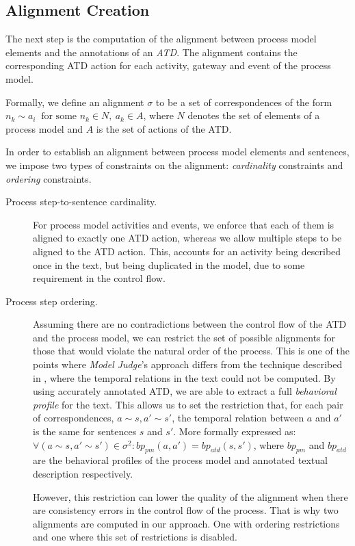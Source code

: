 \subsection{Alignment Creation}
\label{sec:alignment_creation}

The next step is the computation of the alignment between process model elements
and the annotations of an \emph{ATD}. The alignment contains the
corresponding ATD action for each activity, gateway and event of the process model.

\newcommand{\corresp}[2]{#1 \sim #2}
\newcommand{\ncorresp}[2]{#1 \nsim #2}

Formally, we define an alignment $\sigma$ to be a set of correspondences of the
form $\corresp{n_k}{a_i} ~ \text{ for some } n_k \in N, ~ a_k \in A$, where $N$
denotes the set of elements of a process model and  $A$ is the set of actions
of the ATD. 

In order to establish an alignment between process model elements and sentences,
we impose two types of constraints on the alignment:  \textit{cardinality}
constraints and \textit{ordering} constraints.

\begin{description}
\item[Process step-to-sentence cardinality.]{
    For process model activities and events, we enforce that each of them is
    aligned to exactly one ATD action, whereas we allow multiple steps to be aligned
    to the ATD action. This, accounts for an activity being described once in
    the text, but being duplicated in the model, due to some requirement in the
    control flow.}
\item[Process step ordering.]{Assuming there are no contradictions between the
    control flow of the ATD and the process model, we can restrict the set of
    possible alignments for those that would violate the natural order of the
    process. This is one of the points where \emph{Model Judge}'s approach
    differs from the technique described in \cite[Section
    5.6]{10.1007/978-3-319-59536-8_26}, where the temporal relations in the text
    could not be computed. By using accurately annotated ATD, we are able to
    extract a full \emph{behavioral profile} for the text. This allows us to set
    the restriction that, for each pair of correspondences, $a \sim s, a' \sim
    s'$, the temporal relation between $a$ and $a'$ is the same for sentences
    $s$ and $s'$. More formally expressed as: $\forall (a \sim s, a' \sim s')
    \in \sigma^2 : bp_{pm}(a, a') = bp_{atd}(s, s')$, where $bp_{pm}$ and
    $bp_{atd}$ are the behavioral profiles of the process model and annotated
    textual description respectively.
    
    However, this restriction can lower the quality of the alignment when there
    are consistency errors in the control flow of the process. That is why two
    alignments are computed in our approach. One with ordering restrictions and
    one where this set of restrictions is disabled.}
\end{description}

